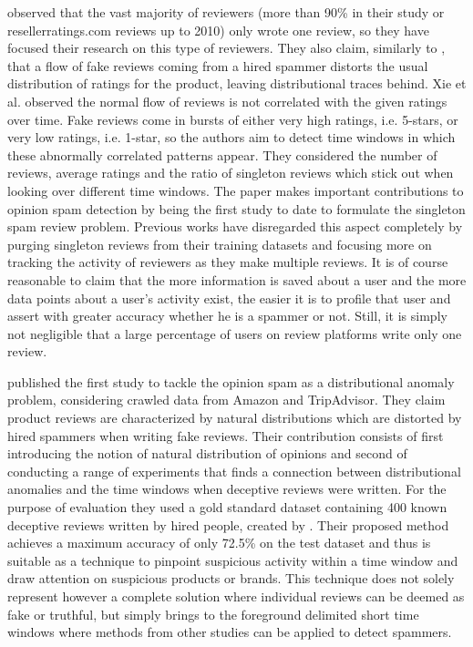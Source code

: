 \citet{Xie2012} observed that the vast majority of reviewers (more than 90\% in their study or resellerratings.com reviews up to 2010) only wrote one review, so they have focused their research on this type of reviewers. They also claim, similarly to \citet{Feng2012}, that a flow of fake reviews coming from a hired spammer distorts the usual distribution of ratings for the product, leaving distributional traces behind. Xie et al. observed the normal flow of reviews is not correlated with the given ratings over time. Fake reviews come in bursts of either very high ratings, i.e. 5-stars, or very low ratings, i.e. 1-star, so the authors aim to detect time windows in which these abnormally correlated patterns appear. They considered the number of reviews, average ratings and the ratio of singleton reviews which stick out when looking over different time windows. The paper makes important contributions to opinion spam detection by being the first study to date to formulate the singleton spam review problem. Previous works have disregarded this aspect completely by purging singleton reviews from their training datasets and focusing more on tracking the activity of reviewers as they make multiple reviews. It is of course reasonable to claim that the more information is saved about a user and the more data points about a user's activity exist, the easier it is to profile that user and assert with greater accuracy whether he is a spammer or not. Still, it is simply not negligible that a large percentage of users on review platforms write only one review.  

\citet{Feng2012} published the first study to tackle the opinion spam as a distributional anomaly problem, considering crawled data from Amazon and TripAdvisor. They claim product reviews are characterized by natural distributions which are distorted by hired spammers when writing fake reviews. Their contribution consists of first introducing the notion of natural distribution of opinions and second of conducting a range of experiments that finds a connection between distributional anomalies and the time windows when deceptive reviews were written. For the purpose of evaluation they used a gold standard dataset containing 400  known deceptive reviews written by hired people, created by \citet{Ott2011}. Their proposed method achieves a maximum accuracy of only 72.5\% on the test dataset and thus is suitable as a technique to pinpoint suspicious activity within a time window and draw attention on suspicious products or brands. This technique does not solely represent however a complete solution where individual reviews can be deemed as fake or truthful, but simply brings to the foreground delimited short time windows where methods from other studies can be applied to detect spammers.

